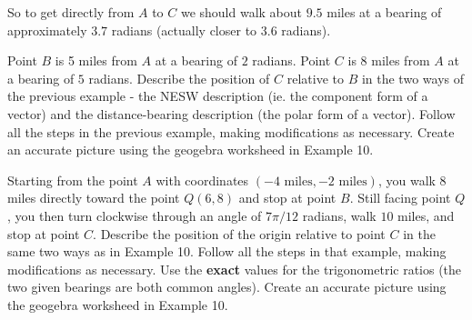 \documentclass{ximera}
\begin{document}
\begin{example}
\begin{explanation}
\begin{question}
\end{question} 


So to get directly from $A$ to $C$ we should walk about $9.5$ miles at a bearing of approximately $3.7$ radians (actually closer to $3.6$ radians).

\end{explanation}


\end{example}


\begin{question} \label{Qdgg4tnh:Vectors}
Point $B$ is 5 miles from $A$ at a bearing of $2$ radians. Point $C$ is $8$ miles from $A$ at a bearing of $5$ radians. Describe  the position of $C$ relative to $B$ in the two ways of the previous example - the NESW description (ie. the component form of a vector) and the distance-bearing description (the polar form of a vector). Follow all the steps in the previous example, making modifications as necessary. Create an accurate picture using the geogebra worksheed in Example 10.

\end{question}


\begin{question}  \label{Qgtsygh:Vectors}
Starting from the point $A$ with coordinates $(-4 \text{ miles},-2 \text{ miles})$, you walk $8$ miles directly toward the point $Q(6,8)$ and stop at point $B$. Still facing point $Q$, you then turn clockwise through an angle of $7\pi/12$ radians, walk $10$ miles, and stop at point $C$. Describe the position of the origin relative to point $C$ in the same two ways as in Example 10. Follow all the steps in that example, making modifications as necessary. Use the {\bf exact} values for the trigonometric ratios (the two given bearings are both common angles).  Create an accurate picture using the geogebra worksheed in Example 10.


\end{question}
\end{document}
